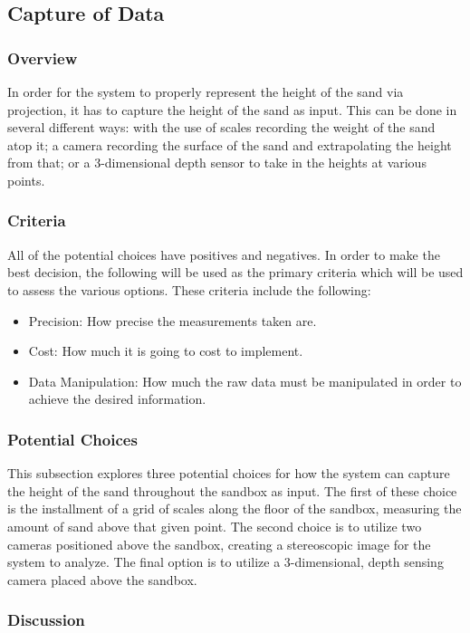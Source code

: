 \subsection{Capture of Data}
\subsubsection{Overview}
In order for the system to properly represent the height of the sand via projection, it has to capture the height of the sand as input.
This can be done in several different ways: with the use of scales recording the weight of the sand atop it; a camera recording the surface of the sand and extrapolating the height from that; or a 3-dimensional depth sensor to take in the heights at various points.
\subsubsection{Criteria}
All of the potential choices have positives and negatives.
In order to make the best decision, the following will be used as the primary criteria which will be used to assess the various options.
These criteria include the following:
\begin{itemize}
\item Precision: How precise the measurements taken are.
\item Cost: How much it is going to cost to implement.
\item Data Manipulation: How much the raw data must be manipulated in order to achieve the desired information.
\end{itemize}

\subsubsection{Potential Choices}

This subsection explores three potential choices for how the system can capture the height of the sand throughout the sandbox as input.
The first of these choice is the installment of a grid of scales along the floor of the sandbox, measuring the amount of sand above that given point.
The second choice is to utilize two cameras positioned above the sandbox, creating a stereoscopic image for the system to analyze.
The final option is to utilize a 3-dimensional, depth sensing camera placed above the sandbox.  

\subsubsection{Discussion}

